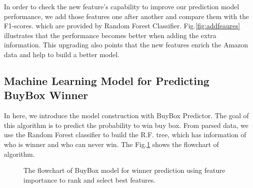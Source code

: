 %

In order to check the new feature's capability to improve our prediction model performance, we add those features one after another and compare them with the F1-scores. which are provided by Random Forest Classifier. Fig.\ref{fig:addfeaures} illustrates that the performance becomes better when adding the extra information. This upgrading also points that the new features enrich the Amazon data and help to build a better model.


\subsection{Machine Learning Model for Predicting BuyBox Winner}
\label{sec:buyboxmodel}

In here, we introduce the model construction with BuyBox Predictor. The goal of this algorithm is to predict the probability to win buy box. From parsed data, we use the Random Forest classifier to build the R.F. tree, which has information of who is winner and who can never win. The Fig.\ref{fig:buyboxflow} shows the flowchart of algorithm.

\begin{figure}[!h]
	\begin{center}
	\end{center}
	\caption{\label{fig:buyboxflow}The flowchart of BuyBox model for winner prediction using feature importance to rank and select best features.}
\end{figure}

